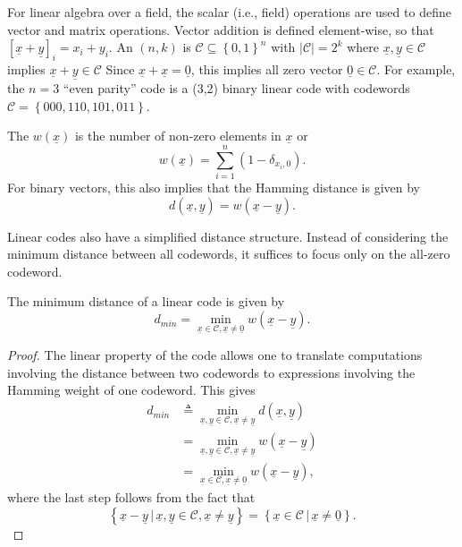 For linear algebra over a field, the scalar (i.e., field) operations are used to define vector and matrix operations.
Vector addition is defined element-wise, so that $\left[\underline{x}+\underline{y}\right]_{i}=x_{i}+y_{i}$.
An $(n,k)$  is $\mathcal{C}\subseteq\left\{ 0,1\right\} ^{n}$ with $\left|\mathcal{C}\right|=2^{k}$ where $\underline{x},\underline{y}\in\mathcal{C}$ implies $\underline{x}+\underline{y}\in\mathcal{C}$
Since $\underline{x}+\underline{x}=\underline{0}$, this implies all zero vector $\underline{0}\in\mathcal{C}$.
For example, the $n=3$ ``even parity'' code is a (3,2) binary linear code with codewords $\mathcal{C}=\left\{ 000,110,101,011\right\} $.

\begin{definition}
The  $w(\underline{x})$ is the number of non-zero elements in $\underline{x}$ or
\[ w(\underline{x}) = \sum_{i=1}^{n}(1-\delta_{x_i , 0}). \]
For binary vectors, this also implies that the Hamming distance is given by
\[d(\underline{x},\underline{y})=w(\underline{x}-\underline{y}). \]
\end{definition}

Linear codes also have a simplified distance structure.
Instead of considering the minimum distance between all codewords, it suffices to focus only on the all-zero codeword.

\begin{proposition}
The minimum distance of a linear code is given by
\[ d_{min} =\min_{\underline{x}\in\mathcal{C},\underline{x}\neq\underline{0}}w(\underline{x}-\underline{y}). \]
\end{proposition}
\begin{proof}
The linear property of the code allows one to translate computations involving the distance between two codewords to expressions involving the Hamming weight of one codeword.
This gives
\begin{align*}
d_{min}
&\triangleq\min_{\underline{x},\underline{y}\in\mathcal{C},\underline{x}\neq\underline{y}}d(\underline{x},\underline{y}) \\
&=\min_{\underline{x},\underline{y}\in\mathcal{C},\underline{x}\neq\underline{y}}w(\underline{x}-\underline{y}) \\
&=\min_{\underline{x}\in\mathcal{C},\underline{x}\neq\underline{0}}w(\underline{x}-\underline{y}),
\end{align*}
where the last step follows from the fact that
\[ \left\{\underline{x}-\underline{y} \,|\, \underline{x},\underline{y}\in\mathcal{C},\underline{x}\neq \underline{y} \right\}
= \left\{\underline{x}\in\mathcal{C} \,|\, \underline{x}\neq \underline{0} \right\}. \]
\end{proof}

